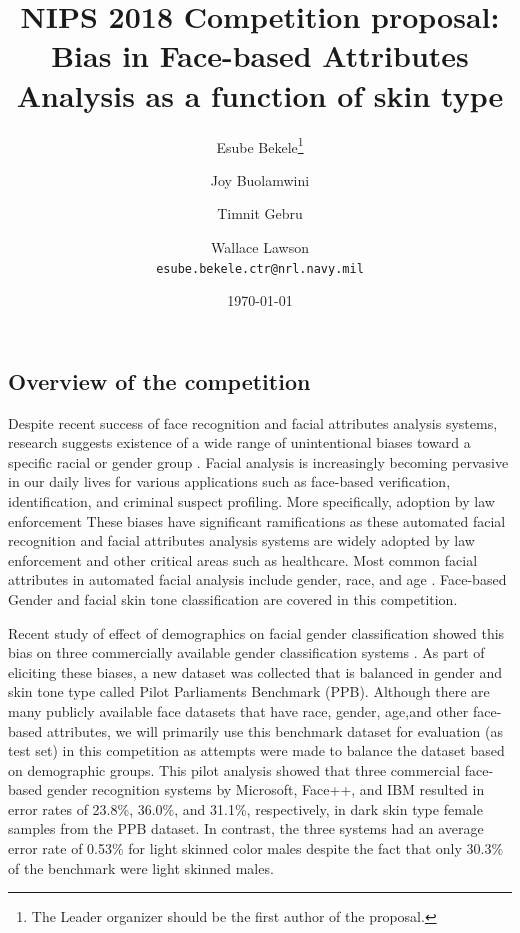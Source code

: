 \documentclass[11pt, oneside]{article}
\title{NIPS 2018 Competition proposal: Bias in Face-based Attributes Analysis as a function of skin type}
\author{Esube Bekele\thanks{The Leader organizer should be the first author of the proposal.} \and Joy Buolamwini \and Timnit Gebru \and Wallace Lawson 
    \\
{\tt esube.bekele.ctr@nrl.navy.mil}\\
}
\date{\today}
\makeatletter
\let\@internalcite\cite
\def\cite{\def\citeauthoryear##1##2{##1, ##2}\@internalcite}
\makeatother
\begin{document}
\maketitle

\subsection{Overview of the competition}

Despite recent success of face recognition and facial attributes  analysis systems, research suggests existence of a wide range of unintentional biases toward a specific racial or gender group \cite{phillips2011other} \cite{klare2012face}. Facial analysis is increasingly becoming pervasive in our daily lives for various applications such as face-based verification, identification, and criminal suspect profiling. More specifically, adoption by  law enforcement These biases have significant ramifications as these automated facial recognition and facial attributes analysis systems are widely adopted by law enforcement and other critical areas such as healthcare. Most common facial attributes in automated facial analysis include gender, race, and age \cite{fu2014learning} \cite{ng2015review} \cite{han2015demographic}. Face-based Gender and facial skin tone classification are covered in this competition.

Recent study of effect of demographics on facial gender classification showed this bias on three commercially available gender classification systems \cite{buolamwini2018gender}. As part of eliciting these biases, a new dataset was collected that is balanced in gender and skin tone type called Pilot Parliaments Benchmark (PPB). Although there are many publicly available face datasets that have race, gender, age,and other face-based attributes, we will primarily use this benchmark dataset for evaluation (as test set) in this competition as attempts were made to balance the dataset based on demographic groups. This pilot analysis showed that three commercial face-based gender recognition systems by Microsoft, Face++, and IBM resulted in error rates of 23.8\%, 36.0\%, and 31.1\%, respectively, in dark skin type female samples from the PPB dataset. In contrast, the three systems had an average error rate of 0.53\% for light skinned color males despite the fact that only 30.3\% of the benchmark were light skinned males.
\end{document}
